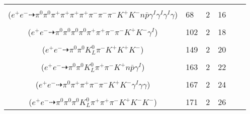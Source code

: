 \documentclass[landscape]{article}
\newcounter{rownumbers}
\newcommand\rn{\stepcounter{rownumbers}\arabic{rownumbers}}
\newcommand{\EOL}{\\} %
\newcommand{\topoTags}[1]{#1} %
\begin{document}
\begin{longtable}{clcccc}
\rn & \makecell[l]{ $ 
e^{+} e^{-} \rightarrow \pi^{0} \pi^{+} \pi^{-} \pi^{-} \eta K^{+} K^{-} \bar{\Sigma}^{0} \Sigma^{+} \gamma^{I} \gamma^{I} \gamma^{I} ,
\eta \rightarrow \pi^{0} \pi^{+} \pi^{-} ,
\bar{\Sigma}^{0} \rightarrow \bar{\Lambda} \gamma ,
\Sigma^{+} \rightarrow \pi^{+} n ,
\bar{\Lambda} \rightarrow \pi^{+} \bar{p} 
$ \\ ($
e^{+} e^{-} \dashrightarrow \pi^{0} \pi^{0} \pi^{+} \pi^{+} \pi^{+} \pi^{+} \pi^{-} \pi^{-} \pi^{-} K^{+} K^{-} n \bar{p} \gamma^{I} \gamma^{I} \gamma^{I} \gamma 
$) } & \topoTags{68 & }2 & 16 \EOL

\rn & \makecell[l]{ $ 
e^{+} e^{-} \rightarrow \pi^{0} \pi^{0} \pi^{0} \pi^{+} \pi^{-} \omega K^{+} K^{-} \gamma^{I} ,
\omega \rightarrow \pi^{0} \pi^{+} \pi^{-} 
$ \\ ($
e^{+} e^{-} \dashrightarrow \pi^{0} \pi^{0} \pi^{0} \pi^{0} \pi^{+} \pi^{+} \pi^{-} \pi^{-} K^{+} K^{-} \gamma^{I} 
$) } & \topoTags{102 & }2 & 18 \EOL

\rn & \makecell[l]{ $ 
e^{+} e^{-} \rightarrow \pi^{0} \bar{K}^{0} K^{*} K^{-} K^{*+} ,
\bar{K}^{0} \rightarrow K_{L}^{0} ,
K^{*} \rightarrow \pi^{-} K^{+} ,
K^{*+} \rightarrow \pi^{0} K^{+} 
$ \\ ($
e^{+} e^{-} \dashrightarrow \pi^{0} \pi^{0} K_{L}^{0} \pi^{-} K^{+} K^{+} K^{-} 
$) } & \topoTags{149 & }2 & 20 \EOL

\rn & \makecell[l]{ $ 
e^{+} e^{-} \rightarrow \pi^{0} \pi^{+} \pi^{-} \bar{K}^{*} K^{+} n \bar{p} \gamma^{I} ,
\bar{K}^{*} \rightarrow \pi^{0} \bar{K}^{0} ,
\bar{K}^{0} \rightarrow K_{L}^{0} 
$ \\ ($
e^{+} e^{-} \dashrightarrow \pi^{0} \pi^{0} K_{L}^{0} \pi^{+} \pi^{-} K^{+} n \bar{p} \gamma^{I} 
$) } & \topoTags{163 & }2 & 22 \EOL

\rn & \makecell[l]{ $ 
e^{+} e^{-} \rightarrow \pi^{-} \bar{K}^{*} K^{*+} \eta^{\prime} \gamma^{I} ,
\bar{K}^{*} \rightarrow \pi^{+} K^{-} ,
K^{*+} \rightarrow \pi^{0} K^{+} ,
\eta^{\prime} \rightarrow \pi^{+} \pi^{-} \eta ,
\eta \rightarrow \gamma \gamma 
$ \\ ($
e^{+} e^{-} \dashrightarrow \pi^{0} \pi^{+} \pi^{+} \pi^{-} \pi^{-} K^{+} K^{-} \gamma^{I} \gamma \gamma 
$) } & \topoTags{167 & }2 & 24 \EOL

\rn & \makecell[l]{ $ 
e^{+} e^{-} \rightarrow \pi^{0} \pi^{-} \rho^{+} K^{0} \bar{K}^{*} K^{-} K^{*+} ,
\rho^{+} \rightarrow \pi^{0} \pi^{+} ,
K^{0} \rightarrow K_{L}^{0} ,
\bar{K}^{*} \rightarrow \pi^{+} K^{-} ,
K^{*+} \rightarrow \pi^{0} K^{+} 
$ \\ ($
e^{+} e^{-} \dashrightarrow \pi^{0} \pi^{0} \pi^{0} K_{L}^{0} \pi^{+} \pi^{+} \pi^{-} K^{+} K^{-} K^{-} 
$) } & \topoTags{171 & }2 & 26 \EOL


\end{longtable}
\end{document}
